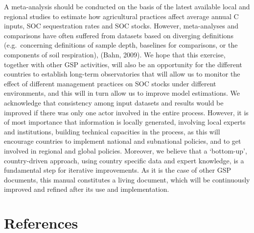 \documentclass[
  10pt,
  b5paper,
]{book}
\begin{document}
A meta-analysis should be conducted on the basis of the latest available local and regional studies to estimate how agricultural practices affect average annual C inputs, SOC sequestration rates and SOC stocks. However, meta-analyses and comparisons have often suffered from datasets based on diverging definitions (e.g.~concerning definitions of sample depth, baselines for comparisons, or the components of soil respiration), (Bahn, 2009). We hope that this exercise, together with other GSP activities, will also be an opportunity for the different countries to establish long-term observatories that will allow us to monitor the effect of different management practices on SOC stocks under different environments, and this will in turn allow us to improve model estimations.
We acknowledge that consistency among input datasets and results would be improved if there was only one actor involved in the entire process. However, it is of most importance that information is locally generated, involving local experts and institutions, building technical capacities in the process, as this will encourage countries to implement national and subnational policies, and to get involved in regional and global policies. Moreover, we believe that a `bottom-up', country-driven approach, using country specific data and expert knowledge, is a fundamental step for iterative improvements. As it is the case of other GSP documents, this manual constitutes a living document, which will be continuously improved and refined after its use and implementation.

\hypertarget{references}{%
\chapter{References}\label{references}}

  


\end{document}
